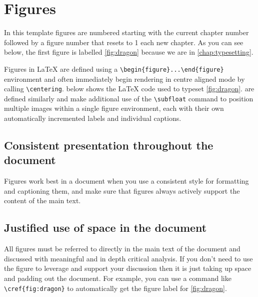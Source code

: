 \section{Figures}
	\label{sec:typesetting_figures}

In this template figures are numbered starting with the current chapter number followed by a figure number that resets to 1 each new chapter.
As you can see below, the first figure is labelled \cref{fig:dragon} because we are in \cref{chap:typesetting}.
	
Figures in \LaTeX{} are defined using a \lstinline|\begin{figure}...\end{figure}| environment and often immediately begin rendering in centre aligned mode by calling \lstinline|\centering|.
 below shows the \LaTeX{} code used to typeset \cref{fig:dragon}.  are defined similarly and make additional use of the \lstinline|\subfloat| command to position multiple images within a single figure environment, each with their own automatically incremented labels and individual captions.

	


	\subsection{Consistent presentation throughout the document}

Figures work best in a document when you use a consistent style for formatting and captioning them, and make sure that figures always actively support the content of the main text. 


	\subsection{Justified use of space in the document}

All figures must be referred to directly in the main text of the document and discussed with meaningful and in depth critical analysis.
If you don't need to use the figure to leverage and support your discussion then it is just taking up space and padding out the document.
For example, you can use a command like \lstinline|\cref{fig:dragon}| to automatically get the figure label for \cref{fig:dragon}. 	

